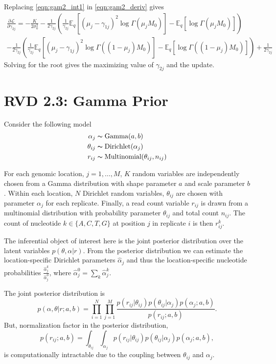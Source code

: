 \documentclass[10pt, letterpaper]{article}
\newcommand{\E}{\mathbb{E}}
\begin{document}
Replacing \eqref{eqn:gam2_int1} in \eqref{eqn:gam2_deriv} gives
\begin{multline}
\frac{\partial \mathcal{L}}{\partial \gamma_{2j}} = -\frac{K}{2\sigma_0^2} 
- \frac{1}{2\gamma_{2j}}\left(\frac{1}{\gamma_{2j}} \E_q \left[ (\mu_j-\gamma_{1j})^2 \log\Gamma(\mu_jM_0) \right] - \E_q \left[ \log\Gamma(\mu_jM_0) \right] \right) \\
- \frac{1}{2\gamma_{2j}}\left(\frac{1}{\gamma_{2j}} \E_q \left[ (\mu_j-\gamma_{1j})^2 \log\Gamma((1-\mu_j)M_0) \right] - \E_q \left[ \log\Gamma((1-\mu_j)M_0) \right] \right) +\frac{1}{2\gamma_{2j}}
\end{multline}
Solving for the root gives the maximizing value of $\gamma_{2j}$ and the update.


\section{RVD 2.3: Gamma Prior}
Consider the following model
\begin{align}
\alpha_j &\thicksim \text{Gamma}(a, b)\\
\theta_{ij} &\thicksim \text{Dirichlet}(\alpha_j)\\
r_{ij} &\thicksim \text{Multinomial}(\theta_{ij}, n_{ij})
\end{align}

For each genomic location, $j=1,\ldots,M$, $K$ random variables are independently chosen from a Gamma distribution with shape parameter $a$ and scale parameter $b$. Within each location, $N$ Dirichlet random variables, $\theta_{ij}$ are chosen with parameter $\alpha_j$ for each replicate. Finally, a read count variable $r_{ij}$ is drawn from a multinomial distribution with probability parameter $\theta_{ij}$ and total count $n_{ij}$. The count of nucleotide $k\in\{A, C, T, G\}$ at position $j$ in replicate $i$ is then $r_{ij}^k$.

The inferential object of interest here is the joint posterior distribution over the latent variables $p(\theta, \alpha | r)$. From the posterior distribution we can estimate the location-specific Dirichlet parameters $\hat{\alpha}_j$ and thus the location-specific nucleotide probabilities $\frac{ \hat{\alpha}^k_{j} } { \hat{\alpha}^0_{j} }$, where $\hat{\alpha}^0_{j} = \sum_k \hat{\alpha}^k_j$.

The joint posterior distribution is
\begin{equation}
p(\alpha, \theta | r; a, b) = \prod_{i=1}^N \prod_{j=1}^M \frac{ p(r_{ij} | \theta_{ij}) p(\theta_{ij} | \alpha_j) p(\alpha_j; a, b) } { p(r_{ij} ; a, b) }.
\end{equation}
But, normalization factor in the posterior distribution,
\begin{equation}
p(r_{ij}; a, b) = \int_{\theta_{ij}} \int_{\alpha_j} p(r_{ij} | \theta_{ij}) p(\theta_{ij} | \alpha_j) p(\alpha_j; a, b),
\end{equation}
is computationally intractable due to the coupling between $\theta_{ij}$ and $\alpha_j$.
\end{document}
